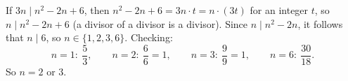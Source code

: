 If $3n\mid n^2-2n+6$, then $n^2-2n+6=3n\cdot t=n\cdot(3t)$ for an integer $t$, so $n\mid n^2-2n+6$ (a divisor of a divisor is a divisor). Since $n\mid n^2-2n$, it follows that $n\mid6$, so $n\in\{1,2,3,6\}$. Checking:
\[n=1:\ \dfrac53,\qquad n=2:\ \dfrac66=1,\qquad n=3:\ \dfrac99=1,\qquad n=6:\ \dfrac{30}{18}.\]
So $n=\boxed{2\text{ or }3}$.
